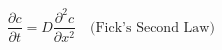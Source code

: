 \documentclass[preview]{standalone}
\begin{document}
\[\frac{\partial c}{\partial t} = D \frac{\partial^2 c}{\partial x^2} \quad \text{(Fick's Second Law)} \tag{2.5}\]
\end{document}
